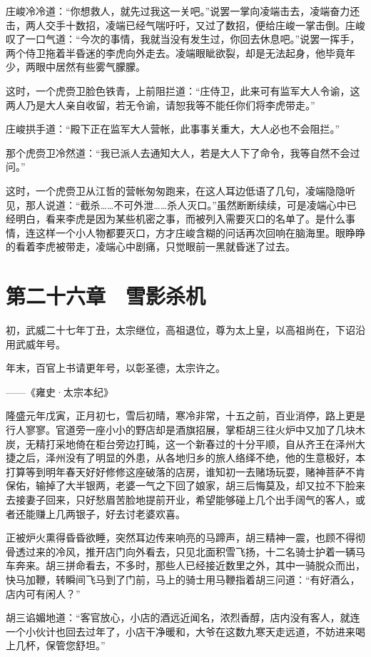 庄峻冷冷道：“你想救人，就先过我这一关吧。”说罢一掌向凌端击去，凌端奋力还击，两人交手十数招，凌端已经气喘吁吁，又过了数招，便给庄峻一掌击倒。庄峻叹了一口气道：“今次的事情，我就当没有发生过，你回去休息吧。”说罢一挥手，两个侍卫拖着半昏迷的李虎向外走去。凌端眼眦欲裂，却是无法起身，他毕竟年少，两眼中居然有些雾气朦朦。

这时，一个虎赍卫脸色铁青，上前阻拦道：“庄侍卫，此来可有监军大人令谕，这两人乃是大人亲自收留，若无令谕，请恕我等不能任你们将李虎带走。”

庄峻拱手道：“殿下正在监军大人营帐，此事事关重大，大人必也不会阻拦。”

那个虎赍卫冷然道：“我已派人去通知大人，若是大人下了命令，我等自然不会过问。”

这时，一个虎赍卫从江哲的营帐匆匆跑来，在这人耳边低语了几句，凌端隐隐听见，那人说道：“截杀……不可外泄……杀人灭口。”虽然断断续续，可是凌端心中已经明白，看来李虎是因为某些机密之事，而被列入需要灭口的名单了。是什么事情，连这样一个小人物都要灭口，方才庄峻含糊的问话再次回响在脑海里。眼睁睁的看着李虎被带走，凌端心中剧痛，只觉眼前一黑就昏迷了过去。

\chapter{第二十六章　雪影杀机}

初，武威二十七年丁丑，太宗继位，高祖退位，尊为太上皇，以高祖尚在，下诏沿用武威年号。

年末，百官上书请更年号，以彰圣德，太宗许之。

——《雍史·太宗本纪》

隆盛元年戊寅，正月初七，雪后初晴，寒冷非常，十五之前，百业消停，路上更是行人寥寥。官道旁一座小小的野店却是酒旗招展，掌柜胡三往火炉中又加了几块木炭，无精打采地倚在柜台旁边打盹，这一个新春过的十分平顺，自从齐王在泽州大捷之后，泽州没有了明显的外患，从各地归乡的旅人络绎不绝，他的生意极好，本打算等到明年春天好好修修这座破落的店房，谁知初一去赌场玩耍，赌神菩萨不肯保佑，输掉了大半银两，老婆一气之下回了娘家，胡三后悔莫及，却又拉不下脸来去接妻子回来，只好愁眉苦脸地提前开业，希望能够碰上几个出手阔气的客人，或者还能赚上几两银子，好去讨老婆欢喜。

正被炉火熏得昏昏欲睡，突然耳边传来响亮的马蹄声，胡三精神一震，也顾不得彻骨透过来的冷风，推开店门向外看去，只见北面积雪飞扬，十二名骑士护着一辆马车奔来。胡三拼命看去，不多时，那些人已经接近数里之外，其中一骑脱众而出，快马加鞭，转瞬间飞马到了门前，马上的骑士用马鞭指着胡三问道：“有好酒么，店内可有闲人？”

胡三谄媚地道：“客官放心，小店的酒远近闻名，浓烈香醇，店内没有客人，就连一个小伙计也回去过年了，小店干净暖和，大爷在这数九寒天走远道，不妨进来喝上几杯，保管您舒坦。”

